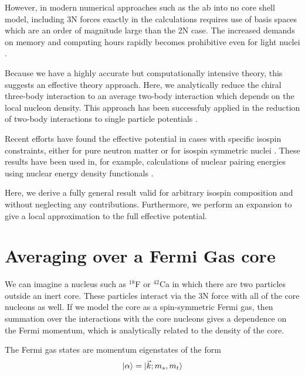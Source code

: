 \documentclass[%
 preprint,
 amsmath,amssymb,
 aps,
]{revtex4-1}
\begin{document}
However, in modern numerical approaches such as the ab into no core shell model, including 3N forces exactly in the calculations requires use of basis spaces which are an order of magnitude large than the 2N case. The increased demands on memory and computing hours  rapidly becomes prohibitive even for light nuclei \cite{Barrett2013131}. 

Because we have a highly accurate but computationally intensive theory, this suggests an effective theory approach. Here, we analytically reduce the chiral three-body interaction to an average two-body interaction which depends on the local nucleon density. This approach has been successfuly applied in the reduction of two-body interactions to single particle potentials \cite{PhysRev.133.B329,AdelbergerHaxton}.

Recent efforts have found the effective potential in cases with specific isospin constraints, either for pure neutron matter \cite{PhysRevC.82.014314} or for isospin symmetric nuclei \cite{PhysRevC.81.024002}. These results have been used in, for example, calculations of nuclear pairing energies using nuclear energy density functionals \cite{0954-3899-39-1-015108}.

Here, we derive a fully general result valid for arbitrary isospin composition and without neglecting any contributions. Furthermore, we perform an expansion to give a local approximation to the full effective potential.

\section{Averaging over a Fermi Gas core}

We can imagine a nucleus such as $^{18}$F or $^{42}$Ca in which there are two particles outside an inert core. These particles interact via the 3N force with all of the core nucleons as well. If we model the core as a spin-symmetric Fermi gas, then summation over the interactions with the core nucleons gives a dependence on the Fermi momentum, which is analytically related to the density of the core. 

The Fermi gas states are momentum eigenstates of the form
\begin{equation}
\ket{\alpha}=\ket{\vec{k};m_s,m_t}
\end{equation}
\end{document}
